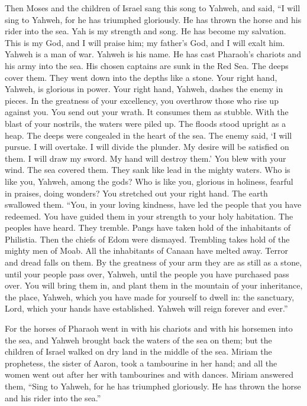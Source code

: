  Then Moses and the children of Israel sang this song to
Yahweh, and said, ``I will sing to Yahweh, for he has triumphed
gloriously. He has thrown the horse and his rider into the sea.
 Yah is my strength and song. He has become my salvation.
This is my God, and I will praise him; my father's God, and I will exalt
him.  Yahweh is a man of war. Yahweh is his name.
 He has cast Pharaoh's chariots and his army into the sea.
His chosen captains are sunk in the Red Sea.  The deeps
cover them. They went down into the depths like a stone. 
Your right hand, Yahweh, is glorious in power. Your right hand, Yahweh,
dashes the enemy in pieces.  In the greatness of your
excellency, you overthrow those who rise up against you. You send out
your wrath. It consumes them as stubble.  With the blast of
your nostrils, the waters were piled up. The floods stood upright as a
heap. The deeps were congealed in the heart of the sea.  The
enemy said, `I will pursue. I will overtake. I will divide the plunder.
My desire will be satisfied on them. I will draw my sword. My hand will
destroy them.'  You blew with your wind. The sea covered
them. They sank like lead in the mighty waters.  Who is
like you, Yahweh, among the gods? Who is like you, glorious in holiness,
fearful in praises, doing wonders?  You stretched out your
right hand. The earth swallowed them.  ``You, in your
loving kindness, have led the people that you have redeemed. You have
guided them in your strength to your holy habitation.  The
peoples have heard. They tremble. Pangs have taken hold of the
inhabitants of Philistia.  Then the chiefs of Edom were
dismayed. Trembling takes hold of the mighty men of Moab. All the
inhabitants of Canaan have melted away.  Terror and dread
falls on them. By the greatness of your arm they are as still as a
stone, until your people pass over, Yahweh, until the people you have
purchased pass over.  You will bring them in, and plant
them in the mountain of your inheritance, the place, Yahweh, which you
have made for yourself to dwell in: the sanctuary, Lord, which your
hands have established.  Yahweh will reign forever and
ever.''

 For the horses of Pharaoh went in with his chariots and
with his horsemen into the sea, and Yahweh brought back the waters of
the sea on them; but the children of Israel walked on dry land in the
middle of the sea.  Miriam the prophetess, the sister of
Aaron, took a tambourine in her hand; and all the women went out after
her with tambourines and with dances.  Miriam answered
them, ``Sing to Yahweh, for he has triumphed gloriously. He has thrown
the horse and his rider into the sea.''

